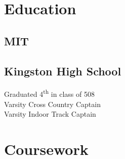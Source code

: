 \documentclass[letterpaper]{deedy-resume} %
\begin{document}
\begin{minipage}[t]{0.33\textwidth} %


\section{Education} 

\subsection{MIT}


\sectionspace %


\subsection{Kingston High School}

Graduated 4\textsuperscript{th} in class of 508 \\
Varsity Cross Country Captain \\
Varsity Indoor Track Captain \\

\sectionspace %


\section{Coursework}



\end{minipage}
\end{document}
